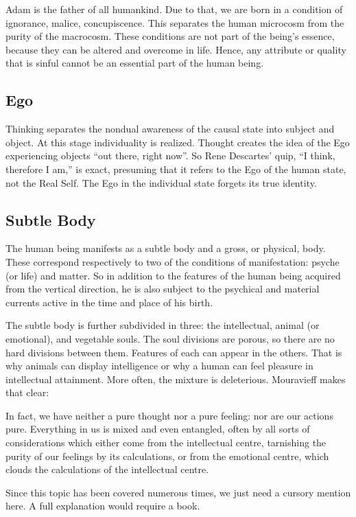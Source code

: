 Adam is the father of all humankind. Due to that, we are born in a condition of ignorance, malice, concupiscence. This separates the human microcosm from the purity of the macrocosm. These conditions are not part of the being's essence, because they can be altered and overcome in life. Hence, any attribute or quality that is sinful cannot be an essential part of the human being.

\subsection*{Ego}
Thinking separates the nondual awareness of the causal state into subject and object. At this stage individuality is realized. Thought creates the idea of the Ego experiencing objects “out there, right now”. So Rene Descartes’ quip, “I think, therefore I am,” is exact, presuming that it refers to the Ego of the human state, not the Real Self. The Ego in the individual state forgets its true identity.

\subsection*{Subtle Body}
The human being manifests as a subtle body and a gross, or physical, body. These correspond respectively to two of the conditions of manifestation: psyche (or life) and matter. So in addition to the features of the human being acquired from the vertical direction, he is also subject to the psychical and material currents active in the time and place of his birth.

The subtle body is further subdivided in three: the intellectual, animal (or emotional), and vegetable souls. The soul divisions are porous, so there are no hard divisions between them. Features of each can appear in the others. That is why animals can display intelligence or why a human can feel pleasure in intellectual attainment. More often, the mixture is deleterious. Mouravieff makes that clear:

\begin{quotex}
In fact, we have neither a pure thought nor a pure feeling: nor are our actions pure. Everything in us is mixed and even entangled, often by all sorts of considerations which either come from the intellectual centre, tarnishing the purity of our feelings by its calculations, or from the emotional centre, which clouds the calculations of the intellectual centre. 

\end{quotex}
Since this topic has been covered numerous times, we just need a cursory mention here. A full explanation would require a book.

